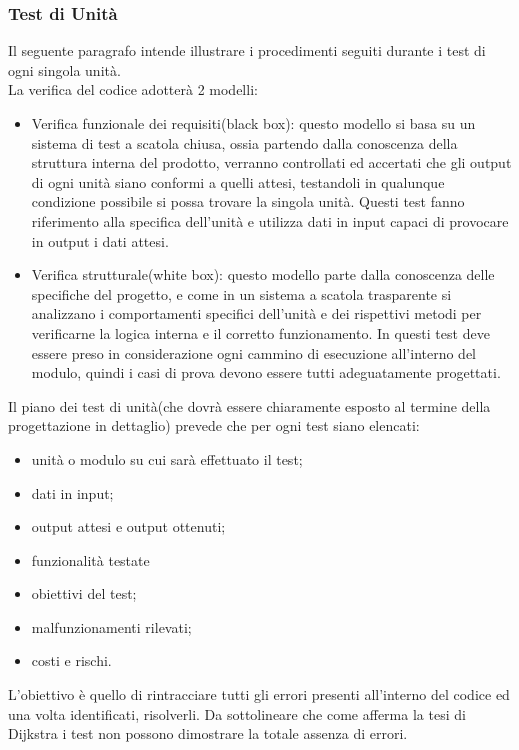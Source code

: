\subsubsection{Test di Unit\`a}
Il seguente paragrafo intende illustrare i procedimenti seguiti durante i test
di ogni singola unit\`a.\\
La verifica del codice adotter\`a 2 modelli:

\begin{itemize}
  \item Verifica funzionale dei requisiti(black box): questo modello si basa su un sistema 
di test a scatola chiusa, ossia partendo dalla conoscenza della struttura interna del 
prodotto, verranno controllati ed accertati che gli output di ogni unit\`a siano  conformi 
a quelli attesi, testandoli in qualunque condizione possibile si possa trovare la singola 
unit\`a. Questi test fanno riferimento alla specifica dell'unit\`a e utilizza dati in input 
capaci di provocare in output i dati attesi.
  \item Verifica strutturale(white box): questo modello parte dalla conoscenza  delle 
specifiche del progetto, e come in un sistema a scatola trasparente si analizzano i 
comportamenti specifici dell'unit\`a e dei rispettivi metodi per verificarne la logica 
interna e il corretto funzionamento. In questi test deve essere preso in considerazione 
ogni cammino di esecuzione all'interno del modulo, quindi i casi di prova devono essere 
tutti adeguatamente progettati. 
\end{itemize}


Il piano dei test di unit\`a(che dovr\`a essere chiaramente esposto al termine della 
progettazione in dettaglio) prevede che per ogni test siano elencati:

\begin{itemize}
  \item unit\`a o modulo su cui sar\`a effettuato il test;
  \item dati in input;
  \item output attesi e output ottenuti;
  \item funzionalit\`a testate
  \item obiettivi del test;
  \item malfunzionamenti rilevati;
  \item costi e rischi.
\end{itemize}

L'obiettivo \`e quello di rintracciare tutti gli errori presenti all'interno del
codice ed una volta identificati, risolverli. Da sottolineare che come afferma la tesi di Dijkstra 
i test non possono dimostrare la totale assenza di errori.

